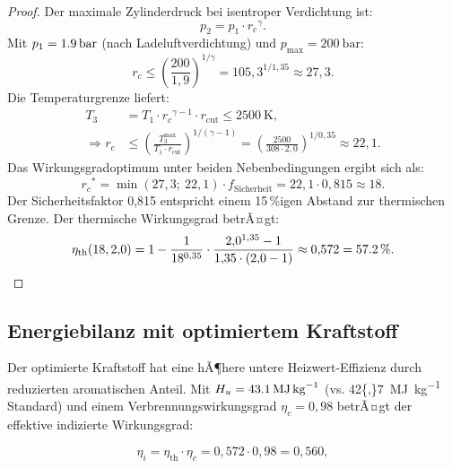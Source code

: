 ﻿\documentclass[12pt,a4paper]{article}
\newcommand{\etath}{\ensuremath{\eta_{\mathrm{th}}}}
\newcommand{\rc}{\ensuremath{r_c}}
\newcommand{\rcut}{\ensuremath{r_{\mathrm{cut}}}}
\begin{document}
\begin{proof}
Der maximale Zylinderdruck bei isentroper Verdichtung ist:
\begin{equation}
  p_2 = p_1 \cdot \rc^{\gamma}.
\end{equation}
Mit $p_1 = \SI{1{,}9}{\bar}$ (nach Ladeluftverdichtung) und
$p_{\max} = \SI{200}{\bar}$:
\begin{equation}
  \rc \leq \left(\frac{200}{1{,}9}\right)^{1/\gamma}
       = 105{,}3^{1/1{,}35} \approx 27{,}3.
\end{equation}
Die Temperaturgrenze liefert:
\begin{align}
  T_3 &= T_1 \cdot \rc^{\gamma-1} \cdot \rcut
       \leq \SI{2500}{\K}, \\
  \Rightarrow \rc &\leq \left(\frac{T_3^{\max}}{T_1 \cdot \rcut}\right)^{1/(\gamma-1)}
       = \left(\frac{2500}{308 \cdot 2{,}0}\right)^{1/0{,}35}
       \approx 22{,}1.
\end{align}
Das Wirkungsgradoptimum unter beiden Nebenbedingungen ergibt sich als:
\begin{equation}
  \rc^* = \min\left(27{,}3;\ 22{,}1\right) \cdot f_{\mathrm{Sicherheit}}
  = 22{,}1 \cdot 0{,}815 \approx 18.
\end{equation}
Der Sicherheitsfaktor 0{,}815 entspricht einem 15\,\%igen Abstand zur
thermischen Grenze. Der thermische Wirkungsgrad betrÃ¤gt:
\begin{equation}
  \etath(18, 2{,}0) = 1 - \frac{1}{18^{0{,}35}} \cdot
  \frac{2{,}0^{1{,}35} - 1}{1{,}35 \cdot (2{,}0 - 1)}
  \approx 0{,}572 = \SI{57{,}2}{\percent}.
\end{equation}
\end{proof}

\subsection{Energiebilanz mit optimiertem Kraftstoff}
\label{sec:thermo_energiebilanz}

Der optimierte Kraftstoff hat eine hÃ¶here untere Heizwert-Effizienz
durch reduzierten aromatischen Anteil. Mit $H_u = \SI{43{,}1}{\mega\joule\per\kg}$
(vs. \SI{42{,}7}{\mega\joule\per\kg} Standard) und einem Verbrennungswirkungsgrad
$\eta_c = 0{,}98$ betrÃ¤gt der effektive indizierte Wirkungsgrad:

\begin{equation}
  \eta_i = \etath \cdot \eta_c = 0{,}572 \cdot 0{,}98 = 0{,}560,
\end{equation}
\end{document}

